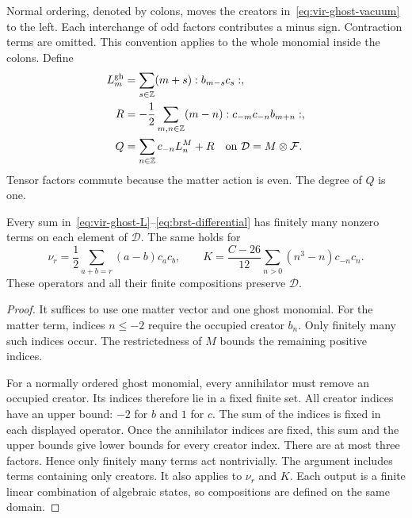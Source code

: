 Normal ordering, denoted by colons, moves the creators in~\eqref{eq:vir-ghost-vacuum} to the left.
Each interchange of odd factors contributes a minus sign.
Contraction terms are omitted.
This convention applies to the whole monomial inside the colons.
Define
\begin{align}
 L_m^{\mathrm{gh}}&=\sum_{s\in\mathbb Z}(m+s):b_{m-s}c_s:,
 \label{eq:vir-ghost-L}\\
 R&=-\frac12\sum_{m,n\in\mathbb Z}(m-n):c_{-m}c_{-n}b_{m+n}:,
 \label{eq:vir-ghost-R}\\
 Q&=\sum_{n\in\mathbb Z}c_{-n}L_n^M+R
 \quad\hbox{on }\mathcal D=M\otimes\mathcal F.
 \label{eq:brst-differential}
\end{align}
Tensor factors commute because the matter action is even.
The degree of $Q$ is one.

\begin{lemma}\label{lem:vir-domain}
Every sum in~\eqref{eq:vir-ghost-L}--\eqref{eq:brst-differential} has finitely many nonzero terms on each element of $\mathcal D$.
The same holds for
\[
 \nu_r=\frac12\sum_{a+b=r}(a-b)c_ac_b,
 \qquad
 K=\frac{C-26}{12}\sum_{n>0}(n^3-n)c_{-n}c_n.
\]
These operators and all their finite compositions preserve $\mathcal D$.
\end{lemma}

\begin{proof}
It suffices to use one matter vector and one ghost monomial.
For the matter term, indices $n\leq-2$ require the occupied creator $b_n$.
Only finitely many such indices occur.
The restrictedness of $M$ bounds the remaining positive indices.

For a normally ordered ghost monomial, every annihilator must remove an occupied creator.
Its indices therefore lie in a fixed finite set.
All creator indices have an upper bound: $-2$ for $b$ and $1$ for $c$.
The sum of the indices is fixed in each displayed operator.
Once the annihilator indices are fixed, this sum and the upper bounds give lower bounds for every creator index.
There are at most three factors.
Hence only finitely many terms act nontrivially.
The argument includes terms containing only creators.
It also applies to $\nu_r$ and $K$.
Each output is a finite linear combination of algebraic states, so compositions are defined on the same domain.
\end{proof}

